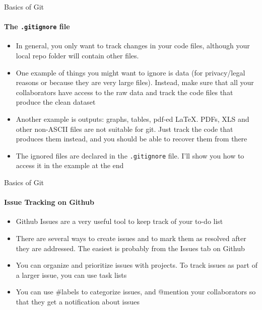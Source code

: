 \documentclass[10pt, aspectratio=169, xcolor=dvipsnames]{beamer}
\let\olditem\item
\renewcommand{\item}{%
\olditem\vspace{0.3em}}
\begin{document}
\begin{frame}[t]{Basics of Git}
    \framesubtitle{The \texttt{.gitignore} file}

    \normalsize\vspace{0.5em}
    \begin{itemize}
        \item In general, you only want to track changes in your code files, although your local repo folder will contain other files.
        \item One example of things you might want to ignore is data (for privacy/legal reasons or because they are very large files). Instead, make sure that all your collaborators have access to the raw data and track the code files that produce the clean dataset
        \item Another example is outputs: graphs, tables, pdf-ed LaTeX. PDFs, XLS and other non-ASCII files are not suitable for git. Just track the code that produces them instead, and you should be able to recover them from there
        \item The ignored files are declared in the \texttt{.gitignore} file. I'll show you how to access it in the example at the end
    \end{itemize}
\end{frame}

\begin{frame}[t]{Basics of Git}
    \framesubtitle{Issue Tracking on Github}

    \normalsize\vspace{0.5em}
    \begin{itemize}
        \item Github Issues are a very useful tool to keep track of your to-do list
        \item There are several ways to create issues and to mark them as resolved after they are addressed. The easiest is probably from the Issues tab on Github
        \item You can organize and prioritize issues with projects. To track issues as part of a larger issue, you can use task lists
        \item You can use \#labels to categorize issues, and @mention your collaborators so that they get a notification about issues
    \end{itemize}
\end{frame}
\end{document}
